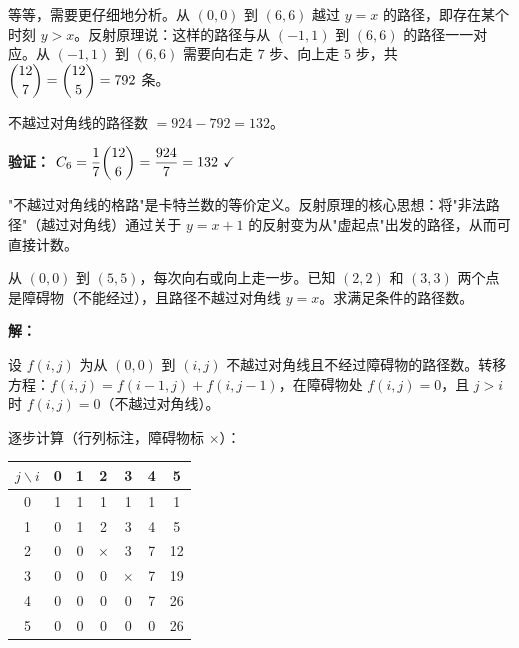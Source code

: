 \documentclass[12pt, a4paper]{ctexart}
\begin{document}
等等，需要更仔细地分析。从 \((0,0)\) 到 \((6,6)\) 越过 \(y=x\) 的路径，即存在某个时刻 \(y > x\)。反射原理说：这样的路径与从 \((-1,1)\) 到 \((6,6)\) 的路径一一对应。从 \((-1,1)\) 到 \((6,6)\) 需要向右走 \(7\) 步、向上走 \(5\) 步，共 \(\dbinom{12}{7} = \dbinom{12}{5} = 792\) 条。

不越过对角线的路径数 \(= 924 - 792 = 132\)。

\textbf{验证：} \(C_6 = \dfrac{1}{7}\dbinom{12}{6} = \dfrac{924}{7} = 132\) \(\checkmark\)

\begin{tipbox}[方法总结]
"不越过对角线的格路"是卡特兰数的等价定义。反射原理的核心思想：将"非法路径"（越过对角线）通过关于 \(y=x+1\) 的反射变为从"虚起点"出发的路径，从而可直接计数。
\end{tipbox}

\vspace{6pt}

\begin{examplebox}
从 \((0,0)\) 到 \((5,5)\)，每次向右或向上走一步。已知 \((2,2)\) 和 \((3,3)\) 两个点是障碍物（不能经过），且路径不越过对角线 \(y=x\)。求满足条件的路径数。
\end{examplebox}

\textbf{解：}

设 \(f(i,j)\) 为从 \((0,0)\) 到 \((i,j)\) 不越过对角线且不经过障碍物的路径数。转移方程：\(f(i,j) = f(i-1,j)+f(i,j-1)\)，在障碍物处 \(f(i,j)=0\)，且 \(j>i\) 时 \(f(i,j)=0\)（不越过对角线）。

逐步计算（行列标注，障碍物标 \(\times\)）：

\begin{center}
\renewcommand{\arraystretch}{1.3}
\begin{tabular}{c|cccccc}
  \(j\backslash i\) & 0 & 1 & 2 & 3 & 4 & 5 \\
  \hline
  0 & 1 & 1 & 1 & 1 & 1 & 1 \\
  1 & 0 & 1 & 2 & 3 & 4 & 5 \\
  2 & 0 & 0 & \(\times\) & 3 & 7 & 12 \\
  3 & 0 & 0 & 0 & \(\times\) & 7 & 19 \\
  4 & 0 & 0 & 0 & 0 & 7 & 26 \\
  5 & 0 & 0 & 0 & 0 & 0 & 26 \\
\end{tabular}
\end{center}
\end{document}
